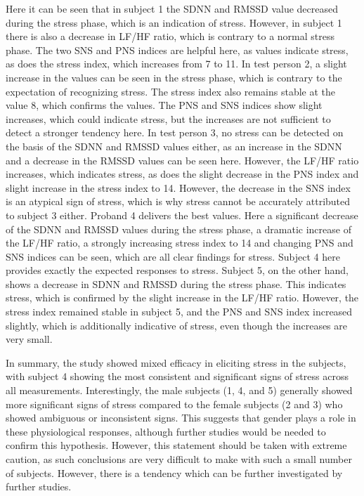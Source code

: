 Here it can be seen that in subject 1 the SDNN and RMSSD value decreased during the stress phase, which is an indication of stress.
However, in subject 1 there is also a decrease in LF/HF ratio, which is contrary to a normal stress phase.
The two SNS and PNS indices are helpful here, as values indicate stress, as does the stress index, which increases from 7 to 11.
In test person 2, a slight increase in the values can be seen in the stress phase, which is contrary to the expectation of recognizing stress.
The stress index also remains stable at the value 8, which confirms the values. 
The PNS and SNS indices show slight increases, which could indicate stress, but the increases are not sufficient to detect a stronger tendency here. 
In test person 3, no stress can be detected on the basis of the SDNN and RMSSD values either, as an increase in the SDNN and a decrease in the RMSSD values can be seen here. 
However, the LF/HF ratio increases, which indicates stress, as does the slight decrease in the PNS index and slight increase in the stress index to 14. 
However, the decrease in the SNS index is an atypical sign of stress, which is why stress cannot be accurately attributed to subject 3 either.
Proband 4 delivers the best values.
Here a significant decrease of the SDNN and RMSSD values during the stress phase, a dramatic increase of the LF/HF ratio, a strongly increasing stress index to 14 and changing PNS and SNS indices can be seen, which are all clear findings for stress.
Subject 4 here provides exactly the expected responses to stress.
Subject 5, on the other hand, shows a decrease in SDNN and RMSSD during the stress phase. 
This indicates stress, which is confirmed by the slight increase in the LF/HF ratio.
However, the stress index remained stable in subject 5, and the PNS and SNS index increased slightly, which is additionally indicative of stress, even though the increases are very small.

In summary, the study showed mixed efficacy in eliciting stress in the subjects, with subject 4 showing the most consistent and significant signs of stress across all measurements. Interestingly, the male subjects (1, 4, and 5) generally showed more significant signs of stress compared to the female subjects (2 and 3) who showed ambiguous or inconsistent signs. This suggests that gender plays a role in these physiological responses, although further studies would be needed to confirm this hypothesis.
However, this statement should be taken with extreme caution, as such conclusions are very difficult to make with such a small number of subjects.
However, there is a tendency which can be further investigated by further studies.


